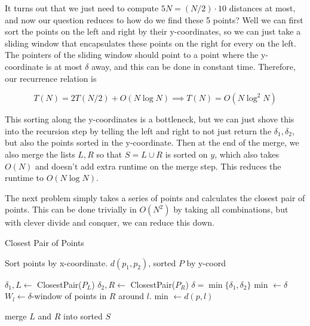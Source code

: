 \documentclass{article}
\begin{document}
    It turns out that we just need to compute $5N = (N/2) \cdot 10$ distances at most, and now our question reduces to how do we find these 5 points? Well we can first sort the points on the left and right by their y-coordinates, so we can just take a sliding window that encapsulates these points on the right for every on the left. The pointers of the sliding window should point to a point where the y-coordinate is at most $\delta$ away, and this can be done in constant time. Therefore, our recurrence relation is  

    \begin{equation}
      T(N) = 2 T(N/2) + O(N \log{N}) \implies T(N) = O(N \log^2 {N})
    \end{equation}
    
    This sorting along the y-coordinates is a bottleneck, but we can just shove this into the recursion step by telling the left and right to not just return the $\delta_1, \delta_2$, but also the points sorted in the y-coordinate. Then at the end of the merge, we also merge the lists $L, R$ so that $S = L \cup R$ is sorted on $y$, which also takes $O(N)$ and doesn't add extra runtime on the merge step. This reduces the runtime to $O(N \log{N})$. 

    \begin{algo}
      The next problem simply takes a series of points and calculates the closest pair of points. This can be done trivially in $O(N^2)$ by taking all combinations, but with clever divide and conquer, we can reduce this down. 
      \begin{algorithm}[H]
        \caption{Closest Pair of Points}
        \label{alg:closest_pair}
        \begin{algorithmic}
          \State 
            \State Sort points by x-coordinate. 
              \State \Return $d(p_1, p_2)$, sorted $P$ by y-coord
            \EndIf

            \State $\delta_1, L \gets$ ClosestPair($P_L$)
            \State $\delta_2, R \gets$ ClosestPair($P_R$)
            \State $\delta = \min\{\delta_1, \delta_2\}$ 
            \State min $\gets \delta$
             
              \State $W_l \gets \delta$-window of points in $R$ around $l$. 
               
                  \State min $\gets d(p, l)$
                \EndIf
              \EndFor
            \EndFor

            \State merge $L$ and $R$ into sorted $S$  

            \State {}
          \EndFunction
        \end{algorithmic}
      \end{algorithm}
    \end{algo}
\end{document}

